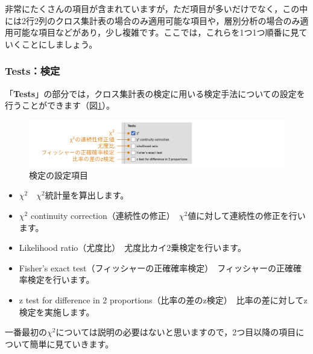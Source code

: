 \documentclass[
  12pt,
  a5jpaper,
  lualatex, ja=standard]{bxjsbook}
\providecommand{\tightlist}{%
  \setlength{\itemsep}{0pt}\setlength{\parskip}{0pt}}
\newenvironment{jmvsettings}{%
	\begin{center}%
	\begin{tcolorbox}[%
		title=設定項目,
		colframe=gmoji,
		colbacktitle=gmoji,
		colback=gmoji!2!white,
		breakable,
		width=.9\textwidth,
		]\small\addtolength{\leftmargini}{-3\labelsep}%
	}%
	{\end{tcolorbox}\end{center}}
\begin{document}
非常にたくさんの項目が含まれていますが，ただ項目が多いだけでなく，この中には2行2列のクロス集計表の場合のみ適用可能な項目や，層別分析の場合のみ適用可能な項目などがあり，少し複雑です。ここでは，これらを1つ1つ順番に見ていくことにしましょう。

\hypertarget{subsub:frequencies-chisq-statistics-tests}{%
\subsubsection*{Tests：検定}\label{subsub:frequencies-chisq-statistics-tests}}

「\textbf{Tests}」の部分では，クロス集計表の検定に用いる検定手法についての設定を行うことができます（図\ref{fig:frequencies-chisq-statistics-tests}）。

\begin{figure}[!ht]

{\centering \includegraphics[width=1\linewidth]{images/frequencies/chisq-statistics-tests} 

}

\caption{検定の設定項目}\label{fig:frequencies-chisq-statistics-tests}
\end{figure}

\begin{jmvsettings}

\begin{itemize}
\tightlist
\item
  \(\chi^2\)　\(\chi^2\)統計量を算出します。
\item
  \(\chi^2\) continuity correction（連続性の修正）　\(\chi^2\)値に対して連続性の修正を行います。
\item
  Likelihood ratio（尤度比）　尤度比カイ2乗検定を行います。
\item
  Fisher's exact test（フィッシャーの正確確率検定）　フィッシャーの正確確率検定を行います。
\item
  z test for difference in 2 proportions（比率の差のz検定）　比率の差に対してz検定を実施します。
\end{itemize}

\end{jmvsettings}

一番最初の\(\chi^2\)については説明の必要はないと思いますので，2つ目以降の項目について簡単に見ていきます。
\end{document}
